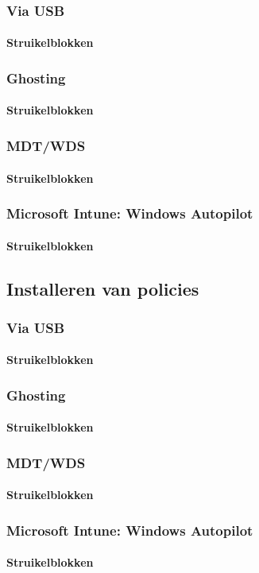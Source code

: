\subsubsection{Via USB}
\paragraph*{Struikelblokken}
\subsubsection{Ghosting}
\paragraph*{Struikelblokken}
\subsubsection{MDT/WDS}
\paragraph*{Struikelblokken}
\subsubsection{Microsoft Intune: Windows Autopilot}
\paragraph*{Struikelblokken}

\subsection{Installeren van policies}

\subsubsection{Via USB}
\paragraph*{Struikelblokken}
\subsubsection{Ghosting}
\paragraph*{Struikelblokken}
\subsubsection{MDT/WDS}
\paragraph*{Struikelblokken}
\subsubsection{Microsoft Intune: Windows Autopilot}
\paragraph*{Struikelblokken}

